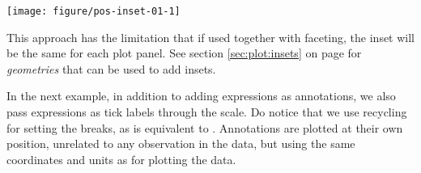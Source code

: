 \documentclass[krantz2]{krantz}\usepackage{knitr}%
\begin{document}
\begin{knitrout}\footnotesize
{}\color{fgcolor}\begin{kframe}
\begin{alltt}
 \hlkwb{<-}   \hlopt{+}
  \hlstd{()}
 \hlopt{+} \hlstd{(} \hlstd{=} \hlstd{)} \hlopt{+}
  \hlstd{(} \hlopt{+} \hlstd{(} \hlstd{=} \hlstd{(}\hlstd{,} \hlstd{),}  \hlstd{=} \hlstd{(}\hlstd{,} \hlstd{))} \hlopt{+}
                               \hlstd{(}\hlstd{)),}
                     \hlstd{=} \hlstd{,}  \hlstd{=} \hlstd{,}  \hlstd{=} \hlstd{,}  \hlstd{=} \hlstd{)}
\end{alltt}
\end{kframe}

{\centering \texttt{[image: figure/pos-inset-01-1]} 

}



\end{knitrout}

This approach has the limitation that if used together with faceting, the inset will be the same for each plot panel. See section \ref{sec:plot:insets} on page \pageref{sec:plot:insets} for \emph{geometries} that can be used to add insets.

In the next example, in addition to adding expressions as annotations, we also pass expressions as tick labels through the scale. Do notice that we use recycling for setting the breaks, as  is equivalent to . Annotations are plotted at their own position, unrelated to any observation in the data, but using the same coordinates and units as for plotting the data.
\end{document}
